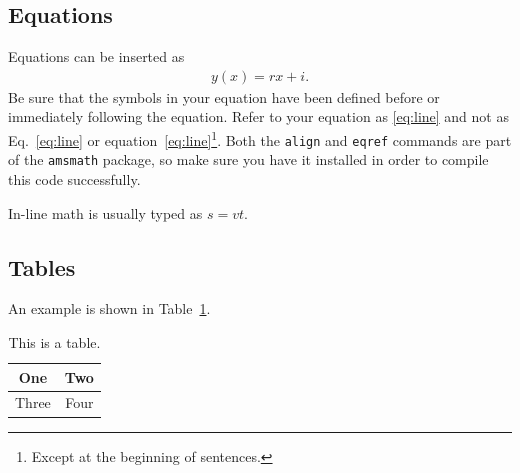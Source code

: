 \documentclass{IEEEtran4PSCC}
\begin{document}
\subsection{Equations}
Equations can be inserted as
\begin{align}
 y(x) = rx + i.\label{eq:line}
\end{align}
Be sure that the symbols in your equation have been defined before or immediately following the equation. Refer to your equation as \eqref{eq:line} and not as Eq.~\eqref{eq:line} or equation~\eqref{eq:line}\footnote{Except at the beginning of sentences.}. Both the \verb+align+ and \verb+eqref+ commands are part of the \verb+amsmath+ package, so make sure you have it installed in order to compile this code successfully.

In-line math is usually typed as $s = v t$.



\subsection{Tables}
%

An example is shown in Table~\ref{table_example}.
\begin{table}[!ht]
\renewcommand{\arraystretch}{1.3}
\centering
\caption{This is a table.}
\label{table_example}
\begin{tabular}{|c|c|}
\hline
One & Two\\
\hline
Three & Four\\
\hline
\end{tabular}
\end{table}
\end{document}
